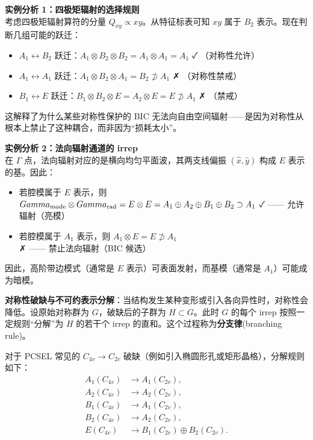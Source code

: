 \textbf{实例分析 1：四极矩辐射的选择规则}\\
考虑四极矩辐射算符的分量 $Q_{xy} \propto xy$。从特征标表可知 $xy$ 属于 $B_2$ 表示。现在判断几组可能的跃迁：
\begin{itemize}
  \item $A_1 \leftrightarrow B_2$ 跃迁：$A_1 \otimes B_2 \otimes B_2 = A_1 \otimes A_1 = A_1$ ✓ （对称性允许）
  \item $A_1 \leftrightarrow A_1$ 跃迁：$A_1 \otimes B_2 \otimes A_1 = B_2 \not\supset A_1$ ✗ （对称性禁戒）
  \item $B_1 \leftrightarrow E$ 跃迁：$B_1 \otimes B_2 \otimes E = A_2 \otimes E = E \not\supset A_1$ ✗ （禁戒）
\end{itemize}
这解释了为什么某些对称性保护的 BIC 无法向自由空间辐射——是因为对称性从根本上禁止了这种耦合，而非因为“损耗太小”。

\textbf{实例分析 2：法向辐射通道的 irrep}\\
在 $\Gamma$ 点，法向辐射对应的是横向均匀平面波，其两支线偏振 $(\hat{x},\hat{y})$ 构成 $E$ 表示的基。因此：
\begin{itemize}
  \item 若腔模属于 $E$ 表示，则 $\Gamma_{\rm mode} \otimes \Gamma_{\rm rad} = E \otimes E = A_1 \oplus A_2 \oplus B_1 \oplus B_2 \supset A_1$ ✓ —— 允许辐射（亮模）
  \item 若腔模属于 $A_1$ 表示，则 $A_1 \otimes E = E \not\supset A_1$ ✗ —— 禁止法向辐射（BIC 候选）
\end{itemize}
因此，高阶带边模式（通常是 $E$ 表示）可表面发射，而基模（通常是 $A_1$）可能成为暗模。

\textbf{对称性破缺与不可约表示分解}：当结构发生某种变形或引入各向异性时，对称性会降低。设原始对称群为 $G$，破缺后的子群为 $H \subset G$。此时 $G$ 的每个 irrep 按照一定规则“分解”为 $H$ 的若干个 irrep 的直和。这个过程称为\textbf{分支律}(branching rule)。

对于 PCSEL 常见的 $C_{4v} \to C_{2v}$ 破缺（例如引入椭圆形孔或矩形晶格），分解规则如下：
\begin{align}
A_1(C_{4v}) &\to A_1(C_{2v}), \nonumber\\
A_2(C_{4v}) &\to A_2(C_{2v}), \nonumber\\
B_1(C_{4v}) &\to A_1(C_{2v}), \nonumber\\
B_2(C_{4v}) &\to A_2(C_{2v}), \nonumber\\
E(C_{4v}) &\to B_1(C_{2v}) \oplus B_2(C_{2v}).
\label{eq:c4v_to_c2v_decomposition}
\end{align}


